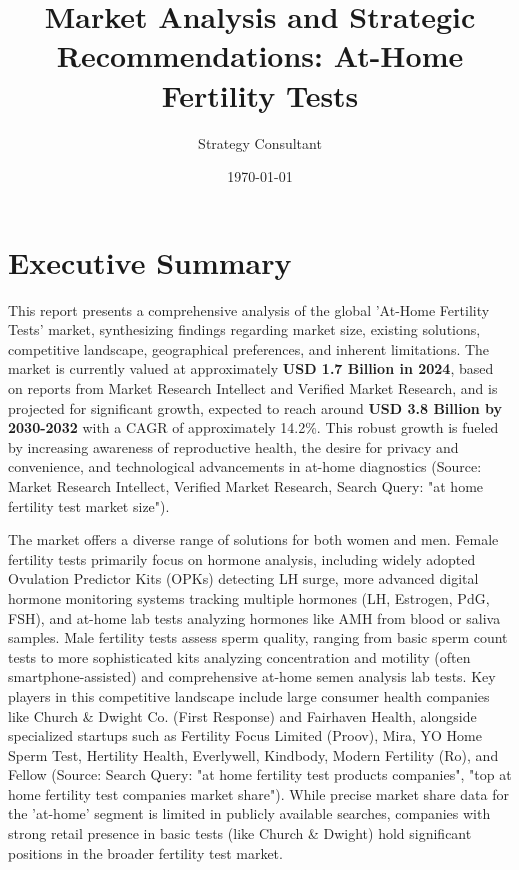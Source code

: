 \documentclass{article}
\title{Market Analysis and Strategic Recommendations: At-Home Fertility Tests}
\author{Strategy Consultant}
\date{\today}
\begin{document}
\maketitle

\section{Executive Summary}

This report presents a comprehensive analysis of the global 'At-Home Fertility Tests' market, synthesizing findings regarding market size, existing solutions, competitive landscape, geographical preferences, and inherent limitations. The market is currently valued at approximately \textbf{USD 1.7 Billion in 2024}, based on reports from Market Research Intellect and Verified Market Research, and is projected for significant growth, expected to reach around \textbf{USD 3.8 Billion by 2030-2032} with a CAGR of approximately 14.2\%. This robust growth is fueled by increasing awareness of reproductive health, the desire for privacy and convenience, and technological advancements in at-home diagnostics (Source: Market Research Intellect, Verified Market Research, Search Query: "at home fertility test market size").

The market offers a diverse range of solutions for both women and men. Female fertility tests primarily focus on hormone analysis, including widely adopted Ovulation Predictor Kits (OPKs) detecting LH surge, more advanced digital hormone monitoring systems tracking multiple hormones (LH, Estrogen, PdG, FSH), and at-home lab tests analyzing hormones like AMH from blood or saliva samples. Male fertility tests assess sperm quality, ranging from basic sperm count tests to more sophisticated kits analyzing concentration and motility (often smartphone-assisted) and comprehensive at-home semen analysis lab tests. Key players in this competitive landscape include large consumer health companies like Church \& Dwight Co. (First Response) and Fairhaven Health, alongside specialized startups such as Fertility Focus Limited (Proov), Mira, YO Home Sperm Test, Hertility Health, Everlywell, Kindbody, Modern Fertility (Ro), and Fellow (Source: Search Query: "at home fertility test products companies", "top at home fertility test companies market share"). While precise market share data for the 'at-home' segment is limited in publicly available searches, companies with strong retail presence in basic tests (like Church \& Dwight) hold significant positions in the broader fertility test market.
\end{document}
